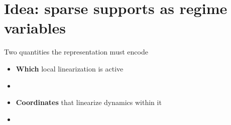 \documentclass[aspectratio=169,10pt]{beamer}
\newcommand{\emphp}[1]{{\color{skaepurple}\bfseries #1}}
\newcommand{\empht}[1]{{\color{skaeteal}\bfseries #1}}
\newenvironment{points}{\large\begin{itemize}\setlength{\itemsep}{0.85em}}{\end{itemize}}
\begin{document}
\section{Idea: sparse supports as regime variables}

\begin{frame}{Two quantities the representation must encode}
  \vfill
  \begin{points}
    \item[\emphp{(i)}] \textbf{Which} local linearization is active
    \item[] 
    \item[\empht{(ii)}] \textbf{Coordinates} that linearize dynamics within it
    \item[] 
  \end{points}
  \vfill
\end{frame}
\end{document}

